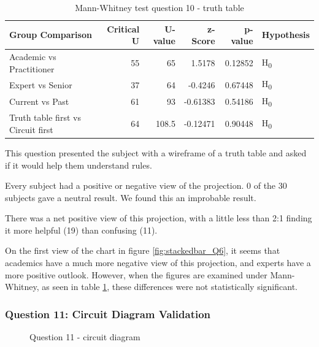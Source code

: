 \begin{table}
    \begin{center}
        \begin{tabular}{ |l ||r |r |r | r|l | } 
            \hline
            Group Comparison                   & Critical U & U-value & z-Score  & p-value & Hypothesis         \\
            \hline
            \hline
            Academic vs Practitioner           &  55        & 65      & 1.5178   & 0.12852 & H\textsubscript{0} \\ 
            \hline
            Expert vs Senior                   &  37        & 64      & -0.4246  & 0.67448 & H\textsubscript{0} \\ 
            \hline
            Current vs Past                    &  61        & 93      & -0.61383 & 0.54186 & H\textsubscript{0} \\ 
            \hline
            Truth table first vs Circuit first &  64        & 108.5   & -0.12471 & 0.90448 & H\textsubscript{0} \\ 
            \hline
        \end{tabular}
    \end{center}
    \caption{Mann-Whitney test question 10 - truth table}
    \label{table:mannwhitneyQ6}
\end{table}

This question presented the subject with a wireframe of a truth table and asked if it would help them understand rules.

Every subject had a positive or negative view of the projection.
0 of the 30 subjects gave a neutral result.
We found this an improbable result.

There was a net positive view of this projection, with a little less than 2:1 finding it more helpful (19) than confusing (11).

On the first view of the chart in figure \ref{fig:stackedbar_Q6}, it seems that academics have a much more negative view of this projection, and experts have a more positive outlook.
However, when the figures are examined under Mann-Whitney, as seen in table \ref{table:mannwhitneyQ6}, these differences were not statistically significant.

\subsubsection{Question 11: Circuit Diagram Validation}

\begin{figure}
    \centering
    \caption{Question 11 - circuit diagram}
    \label{fig:stackedbar_Q7}
\end{figure}

